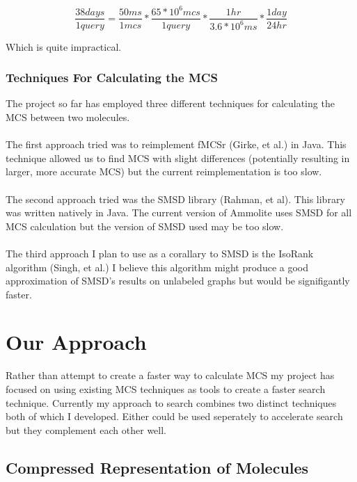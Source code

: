 \documentclass[DIV=calc, paper=a4, fontsize=12pt, twocolumn]{scrartcl}	 %
\begin{document}
\[\frac{38days}{1 query}=\frac{50ms}{1 mcs} * \frac{65 * 10^6 mcs}{1 query} * \frac{1 hr}{3.6 * 10^6ms} * \frac{1 day}{24 hr}\]

Which is quite impractical.

\subsubsection*{Techniques For Calculating the MCS}

The project so far has employed three different techniques for calculating the MCS between two molecules. 
\\\\
The first approach tried was to reimplement fMCSr (Girke, et al.) in Java. This technique allowed us to find MCS with slight differences (potentially resulting in larger, more accurate MCS) but the current reimplementation is too slow.
\\\\
The second approach tried was the SMSD library (Rahman, et al). This library was written natively in Java. The current version of Ammolite uses SMSD for all MCS calculation but the version of SMSD used may be too slow.
\\\\
The third approach I plan to use as a corallary to SMSD is the IsoRank algorithm (Singh, et al.) I believe this algorithm might produce a good approximation of SMSD's results on unlabeled graphs but would be signifigantly faster.




\section*{Our Approach}

Rather than attempt to create a faster way to calculate MCS my project has focused on using existing MCS techniques as tools to create a faster search technique. Currently my approach to search combines two distinct techniques both of which I developed. Either could be used seperately to accelerate search but they complement each other well.

\subsection*{Compressed Representation of Molecules}
\end{document}

